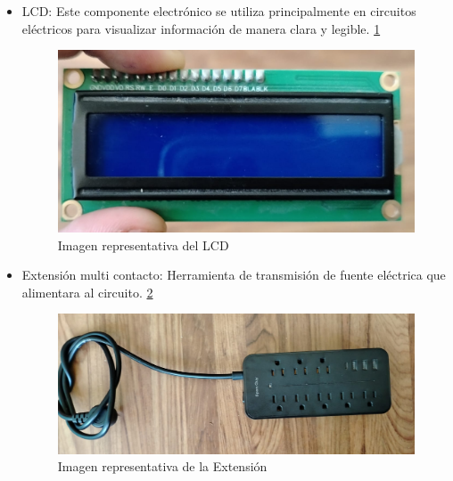     \begin{itemize}
        \item LCD: Este componente electrónico se utiliza principalmente en circuitos eléctricos para visualizar información de manera clara y legible.  \ref{fig:LCD}
    
          \begin{figure}[H]
            \centering
            \includegraphics[trim = {0mm 0mm 0mm 0mm},clip,scale=0.15]{12/Img/lcd.jpg}
            \caption{Imagen representativa del LCD}
            \label{fig:LCD}
        \end{figure}
    \end{itemize}
    
    \begin{itemize}
        \item Extensión multi contacto: Herramienta de transmisión de fuente eléctrica que alimentara al circuito. \ref{fig:extensión}
    
          \begin{figure}[H]
            \centering
            \includegraphics[trim = {0mm 0mm 0mm 0mm},clip,scale=0.15]{12/Img/extensionMultiContacto.jpg}
            \caption{Imagen representativa de la Extensión}
            \label{fig:extensión}
        \end{figure}
    \end{itemize}
    
